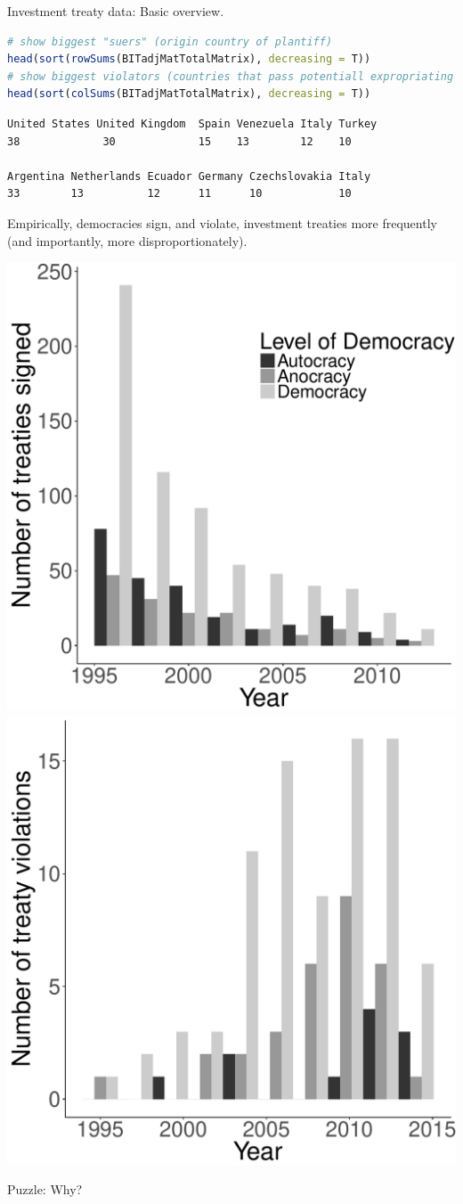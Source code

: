 \documentclass{beamer}
\begin{document}
\begin{frame}[fragile]{\large Investment treaty data: Basic overview.}
\begin{lstlisting}[language=R]
# show biggest "suers" (origin country of plantiff)
head(sort(rowSums(BITadjMatTotalMatrix), decreasing = T))
# show biggest violators (countries that pass potentiall expropriating policies)
head(sort(colSums(BITadjMatTotalMatrix), decreasing = T))
\end{lstlisting}

\begin{verbatim}
United States United Kingdom  Spain Venezuela Italy Turkey 
38             30             15    13        12    10 

Argentina Netherlands Ecuador Germany Czechslovakia Italy 
33        13          12      11      10            10
\end{verbatim}
\end{frame}

\begin{frame}{\large Empirically, democracies sign, and violate, investment treaties more frequently (and importantly, more disproportionately).}

\includegraphics[width=.49\linewidth]{figures/histSignRegimeType.pdf}
\includegraphics[width=.49\linewidth]{figures/histViolationRegimeType.pdf}

\begin{center}
	{\Large Puzzle: Why?}
\end{center}
\end{frame}
\end{document}
